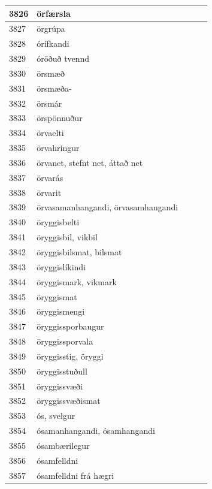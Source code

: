 \begin{longtable}{p{}|p{}|p{}|p{}|p{}}
\hline
3826 & örfærsla &  &  &  \\
\hline
3827 & örgrúpa &  &  &  \\
\hline
3828 & órífkandi &  &  &  \\
\hline
3829 & óröðuð tvennd &  &  &  \\
\hline
3830 & örsmæð &  &  &  \\
\hline
3831 & örsmæða- &  &  &  \\
\hline
3832 & örsmár &  &  &  \\
\hline
3833 & örspönnuður &  &  &  \\
\hline
3834 & örvaelti &  &  &  \\
\hline
3835 & örvahringur &  &  &  \\
\hline
3836 & örvanet, stefnt net, áttað net &  &  &  \\
\hline
3837 & örvarás &  &  &  \\
\hline
3838 & örvarit &  &  &  \\
\hline
3839 & örvasamanhangandi, örvasamhangandi &  &  &  \\
\hline
3840 & öryggisbelti &  &  &  \\
\hline
3841 & öryggisbil, vikbil &  &  &  \\
\hline
3842 & öryggisbilsmat, bilsmat &  &  &  \\
\hline
3843 & öryggislíkindi &  &  &  \\
\hline
3844 & öryggismark, vikmark &  &  &  \\
\hline
3845 & öryggismat &  &  &  \\
\hline
3846 & öryggismengi &  &  &  \\
\hline
3847 & öryggissporbaugur &  &  &  \\
\hline
3848 & öryggissporvala &  &  &  \\
\hline
3849 & öryggisstig, öryggi &  &  &  \\
\hline
3850 & öryggisstuðull &  &  &  \\
\hline
3851 & öryggissvæði &  &  &  \\
\hline
3852 & öryggissvæðismat &  &  &  \\
\hline
3853 & ós, svelgur &  &  &  \\
\hline
3854 & ósamanhangandi, ósamhangandi &  &  &  \\
\hline
3855 & ósambærilegur &  &  &  \\
\hline
3856 & ósamfelldni &  &  &  \\
\hline
3857 & ósamfelldni frá hægri &  &  &  \\
\hline

\end{longtable}
